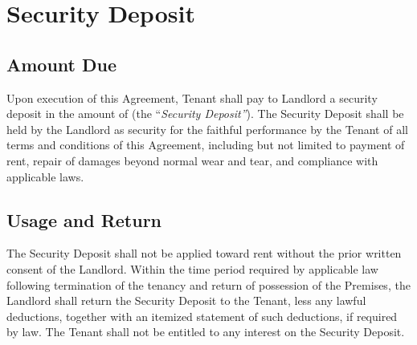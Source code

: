 
\section{Security Deposit}
\label{sec:deposit}

\subsection{Amount Due}
\label{sec:amount}

Upon execution of this Agreement, Tenant shall pay to Landlord a security deposit in the amount of \SecurityDepositAmount{} (the “\textit{Security Deposit”}). The Security Deposit shall be held by the Landlord as security for the faithful performance by the Tenant of all terms and conditions of this Agreement, including but not limited to payment of rent, repair of damages beyond normal wear and tear, and compliance with applicable laws.

\subsection{Usage and Return}
\label{sec:paymentmethod}

The Security Deposit shall not be applied toward rent without the prior written consent of the Landlord. Within the time period required by applicable law following termination of the tenancy and return of possession of the Premises, the Landlord shall return the Security Deposit to the Tenant, less any lawful deductions, together with an itemized statement of such deductions, if required by law. The Tenant shall not be entitled to any interest on the Security Deposit.

